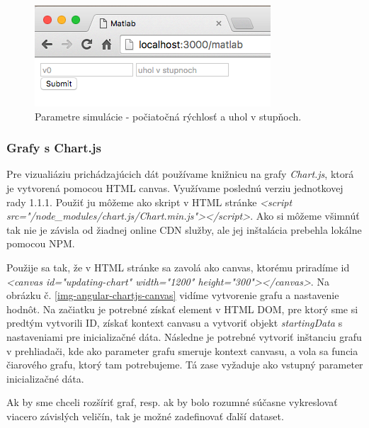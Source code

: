 \begin{figure}[H]
  \centering
  \includegraphics[scale=0.7]{img/code/angular-simulation-param.png}
  \caption{Parametre simulácie - počiatočná rýchlosť a uhol v stupňoch.}
  \label{img-angular-params}
\end{figure}


\subsubsection{Grafy s Chart.js}
Pre vizualiáziu prichádzajúcich dát používame knižnicu na grafy \textit{Chart.js}, ktorá je vytvorená pomocou HTML canvas. Využívame poslednú verziu jednotkovej rady 1.1.1. Použiť ju môžeme ako skript v HTML stránke \textit{<script src="/node\_modules/chart.js/Chart.min.js"></script>}. Ako si môžeme všimnúť tak nie je závisla od žiadnej online CDN služby, ale jej inštalácia prebehla lokálne pomocou NPM.

Použije sa tak, že v HTML stránke sa zavolá ako canvas, ktorému priradíme id \textit{<canvas id="updating-chart" width="1200" height="300"></canvas>}. Na obrázku č. \ref{img-angular-chartjs-canvas} vidíme vytvorenie grafu a nastavenie hodnôt. Na začiatku je potrebné získať element v HTML DOM, pre ktorý sme si predtým vytvorili ID, získať kontext canvasu a vytvoriť objekt \textit{startingData} s nastaveniami pre inicializačné dáta. 
Následne je potrebné vytvoriť inštanciu grafu v prehliadači, kde ako parameter grafu smeruje kontext canvasu, a vola sa funcia čiarového grafu, ktorý tam potrebujeme. Tá zase vyžaduje ako vstupný parameter inicializačné dáta.

Ak by sme chceli rozšíriť graf, resp. ak by bolo rozumné súčasne vykreslovať viacero závislých veličín, tak je možné zadefinovať ďalší dataset.

